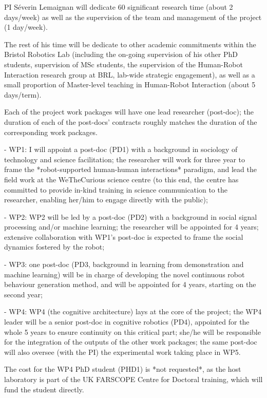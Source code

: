 PI Séverin Lemaignan will dedicate 60%
significant research time (about 2 days/week) as well as the supervision of the team and management 
of the project (1 day/week).

The rest of his time will be dedicate to other academic commitments within the Bristol Robotics Lab 
(including the on-going supervision of his other PhD students, supervision of MSc students, the 
supervision of the Human-Robot Interaction research group at BRL, lab-wide strategic engagement), 
as well as a small proportion of Master-level teaching in Human-Robot Interaction (about 5 days/term).

Each of the project work packages will have one lead researcher (post-doc); the duration of each
 of the post-docs' contracts roughly matches the duration of the corresponding work packages.

-   WP1: I will appoint a post-doc (PD1) with a background in sociology of technology and science facilitation;
    the researcher will work for three year to frame the *robot-supported human-human interactions*
    paradigm, and lead the field work at the WeTheCurious science centre (to
    this end, the centre has committed to provide in-kind training in science
    communication to the researcher, enabling her/him to engage directly with
    the public);

-   WP2: WP2 will be led by a post-doc (PD2) with a background in social signal processing and/or machine 
    learning; the researcher will be appointed for 4 years; extensive collaboration with WP1's post-doc
    is expected to frame the social dynamics fostered by the robot;

-   WP3: one post-doc (PD3, background in learning from demonstration and machine learning) will be in charge 
    of developing the novel continuous robot behaviour generation method, and will be appointed for 4 years, 
    starting on the second year;

-   WP4: WP4 (the cognitive architecture) lays at the core of the project; the WP4 leader will be a senior 
    post-doc in cognitive robotics (PD4), appointed for the whole 5 years to ensure continuity on this critical part; 
    she/he will be responsible for the integration of the outputs of the other work packages; the same post-doc will
    also oversee (with the PI) the experimental work taking place in WP5.

The cost for the WP4 PhD student (PHD1) is *not requested*, as the host
laboratory is part of the UK FARSCOPE Centre for Doctoral training, which will
fund the student directly.

